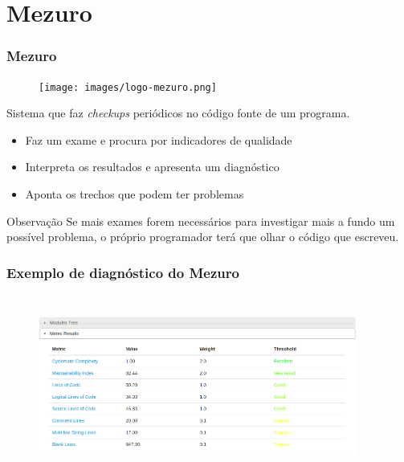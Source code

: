 \documentclass{beamer}
\begin{document}
\section{Mezuro}
\begin{frame}
  \frametitle{Mezuro}
  \begin{figure}
    \begin{flushleft}
    \begin{center}
    \texttt{[image: images/logo-mezuro.png]}
    \end{center}

      \label{fig:logo-mezuro}
    \end{flushleft}
  \end{figure}

  Sistema que faz \textit{checkups} periódicos no código fonte de um programa.
  \begin{itemize}
    \item Faz um exame e procura por indicadores de qualidade
    \item Interpreta os resultados e apresenta um diagnóstico
    \item Aponta os trechos que podem ter problemas
  \end{itemize}

  \begin{block}{Observação}
    Se mais exames forem necessários para investigar mais a fundo um possível problema,
    o próprio programador terá que olhar o código que escreveu.
  \end{block}
\end{frame}

\begin{frame}
  \frametitle{Exemplo de diagnóstico do Mezuro}
  \begin{figure}
    \begin{flushleft}
    \begin{center}
    \includegraphics[width=10.5cm, height=6cm]{images/metric_results.png}
    \end{center}

      \label{fig:logo-mezuro}
    \end{flushleft}
  \end{figure}
\end{frame}
\end{document}
